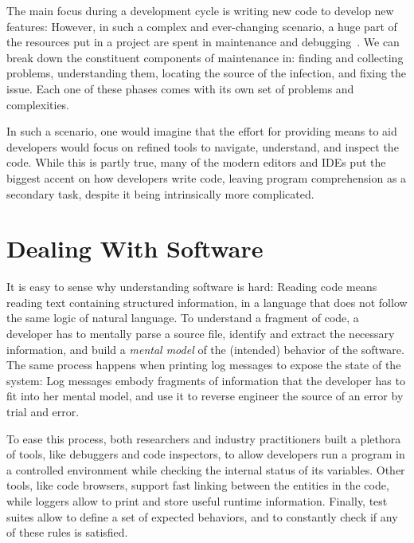 The main focus during a development cycle is writing new code to develop new features: However, in such a complex and ever-changing scenario, a huge part of the resources put in a project are spent in maintenance and debugging~\cite{Corb1989,Fjel1983,Zelk1979,Mine2015b}.
We can break down the constituent components of maintenance in: finding and collecting problems, understanding them, locating the source of the infection, and fixing the issue.
Each one of these phases comes with its own set of problems and complexities.

In such a scenario, one would imagine that the effort for providing means to aid developers would focus on refined tools to navigate, understand, and inspect the code.
While this is partly true, many of the modern editors and IDEs put the biggest accent on how developers write code, leaving program comprehension as a secondary task, despite it being intrinsically more complicated.


\section{Dealing With Software}

It is easy to sense why understanding software is hard: Reading code means reading text containing structured information, in a language that does not follow the same logic of natural language.
To understand a fragment of code, a developer has to mentally parse a source file, identify and extract the necessary information, and build a \emph{mental model} of the (intended) behavior of the software.
The same process happens when printing log messages to expose the state of the system: Log messages embody fragments of information that the developer has to fit into her mental model, and use it to reverse engineer the source of an error by trial and error.

To ease this process, both researchers and industry practitioners built a plethora of tools, like debuggers and code inspectors, to allow developers run a program in a controlled environment while checking the internal status of its variables.
Other tools, like code browsers, support fast linking between the entities in the code, while loggers allow to print and store useful runtime information.
Finally, test suites allow to define a set of expected behaviors, and to constantly check if any of these rules is satisfied.

